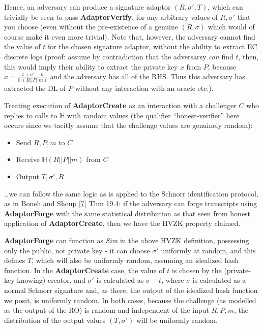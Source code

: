 \documentclass[10pt,a4paper]{article}
\begin{document}
Hence, an adversary can produce a signature adaptor $(R, \sigma', T)$, which can trivially be seen to pass \textbf{AdaptorVerify}, for any arbitrary values of $R, \sigma'$ that you choose (even without the pre-existence of a genuine $(R, \sigma)$ which would of course make it even more trivial). Note that, however, the adversary cannot find the value of $t$ for the chosen signature adaptor, without the ability to extract EC discrete logs (proof: assume by contradiction that the adversarsy \emph{can} find $t$, then, this would imply their ability to extract the private key $x$ from $P$, because $x = \frac{t + \sigma' - k}{\mathbb{H}(R||P||m)}$ and the adversary has all of the RHS. Thus this adversary has extracted the DL of $P$ without any interaction with an oracle etc.).

\vspace{5 pt}

Treating execution of \textbf{AdaptorCreate} as an interaction with a challenger $C$ who replies to calls to $\mathbb{H}$ with random values (the qualifier ``honest-verifier'' here occurs since we tacitly assume that the challenge values are genuinely random):

\begin{itemize}
\item Send $R, P, m$ to $C$
\item Receive $\mathbb{H}(R||P||m)$ from $C$
\item Output $T, \sigma', R$
\end{itemize}

\ldots we can follow the same logic as is applied to the Schnorr identification protocol, as in Boneh and Shoup {[}\protect\hyperlink{anchor-7}{7}{]} Thm 19.4: if the adversary can forge transcripts using \textbf{AdaptorForge} with the same statistical distribution as that seen from honest application of \textbf{AdaptorCreate}, then we have the HVZK property claimed.

\vspace{5 pt}

\textbf{AdaptorForge} can function as \emph{Sim} in the above HVZK definition, possessing only the public, not private key - it can choose $\sigma'$ uniformly at random, and this defines $T$, which will also be uniformly random, assuming an idealized hash function. In the \textbf{AdaptorCreate} case, the value of $t$ is chosen by the (private-key knowing) creator, and $\sigma'$ is calculated as $\sigma - t$, where $\sigma$ is calculated as a normal Schnorr signature and, as there, the output of the idealized hash function we posit, is uniformly random. In both cases, because the challenge (as modelled as the output of the RO) is random and independent of the input $R, P, m$, the distribution of the output values $(T, \sigma')$ will be uniformly random.
\end{document}
